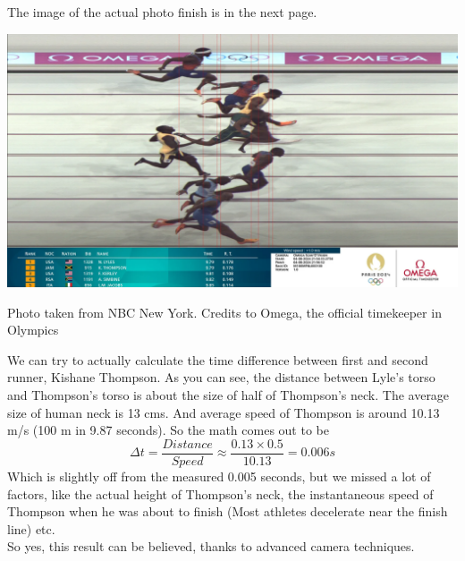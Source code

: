 \documentclass[11pt,a4paper]{article}
\begin{document}
	The image of the actual photo finish is in the next page.
	
	\includegraphics[width=18 cm]{100m2.png}
	\begin{center}
		Photo taken from NBC New York. Credits to Omega, the official timekeeper in Olympics
	\end{center}
	
	We can try to actually calculate the time difference between first and second runner, Kishane Thompson. As you can see, the distance between Lyle's torso and Thompson's torso is about the size of half of Thompson's neck. The average size of human neck is 13 cms. And average speed of Thompson is around 10.13 m/s (100 m in 9.87 seconds). So the math comes out to be
	\[\Delta t = \frac{Distance}{Speed}\approx\frac{0.13 \times 0.5}{10.13}=0.006s\]
	Which is slightly off from the measured 0.005 seconds, but we missed a lot of factors, like the actual height of Thompson's neck, the instantaneous speed of Thompson when he was about to finish (Most athletes decelerate near the finish line) etc. \\
So yes, this result can be believed, thanks to advanced camera techniques.
\end{document}
